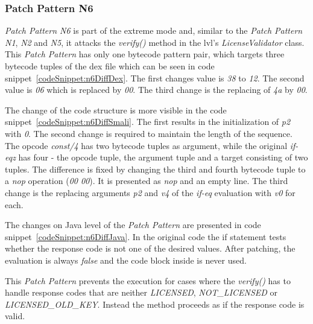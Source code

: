 \subsubsection{Patch Pattern N6}
 \textit{Patch Pattern N6} is part of the extreme mode and, similar to the \textit{Patch Pattern N1}, \textit{N2} and \textit{N5}, it attacks the \textit{verify()} method in the \gls{lvl}'s \textit{LicenseValidator} class.
\newline
This \textit{Patch Pattern} has only one bytecode pattern pair, which targets three bytecode tuples of the \gls{dex} file which can be seen in code snippet~\ref{codeSnippet:n6DiffDex}.
The first changes value is \textit{38} to \textit{12}.
The second value is \textit{06} which is replaced by \textit{00}.
The third change is the replacing of \textit{4a} by \textit{00}.

The change of the code structure is more visible in the code snippet~\ref{codeSnippet:n6DiffSmali}.
The first results in the initialization of \textit{p2} with \textit{0}.
The second change is required to maintain the length of the sequence.
The opcode \textit{const/4} has two bytecode tuples as argument, while the original \textit{if-eqz} has four - the opcode tuple, the argument tuple and a target consisting of two tuples.
The difference is fixed by changing the third and fourth bytecode tuple to a \textit{nop} operation (\textit{00 00}).
It is presented as \textit{nop} and an empty line.
The third change is the replacing arguments \textit{p2} and \textit{v4} of the \textit{if-eq} evaluation with \textit{v0} for each.

The changes on Java level of the \textit{Patch Pattern} are presented in code snippet~\ref{codeSnippet:n6DiffJava}.
In the original code the if statement tests whether the response code is not one of the desired values.
After patching, the evaluation is always \textit{false} and the code block inside is never used.

This \textit{Patch Pattern} prevents the execution for cases where the \textit{verify()} has to handle response codes that are neither \textit{LICENSED}, \textit{NOT\_LICENSED} or \textit{LICENSED\_OLD\_KEY}.
Instead the method proceeds as if the response code is valid.
\newpage
